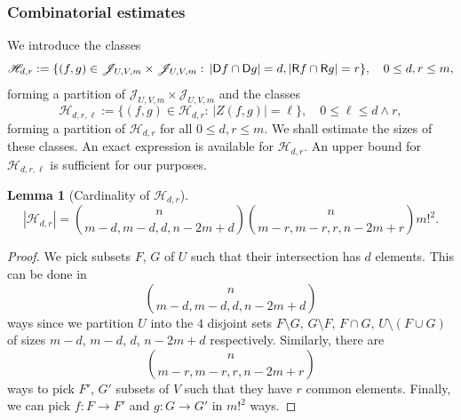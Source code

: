 \documentclass[reqno]{amsart}
\theoremstyle{theorem}
\newtheorem{lemma}[theorem]{Lemma}
\theoremstyle{definition}
\theoremstyle{remark}
\def\HH{\mathscr{H}}
\newcommand{\1}{{\text{\Large $\mathfrak 1$}}}	%
\numberwithin{equation}{section}
\def\JJ{\mathscr J}
\def\ran{{\sf R}}
\def\dom{{\sf D}}
\begin{document}
\subsubsection{\bfseries Combinatorial estimates}
\label{seccombest}
We introduce the classes
\[
\HH_{d,r} :=\{(f,g) \in \JJ_{U,V,m} \times \JJ_{U,V,m}:\,
|\dom f\cap\dom g| = d,
|\ran f\cap\ran g| = r\},
\quad 0 \le d,r \le m,
\]
forming a partition of $\JJ_{U,V,m} \times \JJ_{U,V,m}$
and the classes
\[
\HH_{d,r,\ell} := \{(f,g) \in \HH_{d,r}:\, |Z(f,g)|=\ell\}, \quad 
0 \le \ell \le d \wedge r,
\]
forming a partition of $\HH_{d,r}$ for all $0 \le d,r \le m$.
We shall estimate the sizes of these classes. An exact expression
is available for $\HH_{d,r}$. An upper bound for $\HH_{d,r,\ell}$
is sufficient for our purposes.



\begin{lemma}[Cardinality of $\HH_{d,r}$]
\label{CARD1lem}
\begin{equation}
\label{CARD1eq}
|\HH_{d,r}|
= \binom{n}{m-d, m-d, d, n-2m+d} 
\binom{n}{m-r, m-r, r, n-2m+r} 
m!^2.
\end{equation}
\end{lemma}
\begin{proof}
We pick subsets $F$, $G$ of $U$ such that their intersection has $d$ elements.
This can be done in 
\begin{equation} \label{FGpick}
\binom{n}{m-d, m-d, d, n-2m+d}
\end{equation}
ways since we partition
$U$ into the $4$ disjoint sets $F \setminus G$, $G \setminus F$, $F \cap G$, $U
\setminus (F \cup G)$ of sizes $m - d$, $m - d$, $d$, $n - 2m + d$
respectively.  Similarly, there are 
\begin{equation} \label{F1G1pick}
\binom{n}{m-r, m-r, r, n-2m+r}
\end{equation} 
ways to pick $F'$, $G'$ subsets of $V$ such that they have $r$ common elements.
Finally, we can pick $f: F \rightarrow F'$ and $g: G \rightarrow G'$ in $m!^2$
ways.  
\end{proof}
\end{document}
